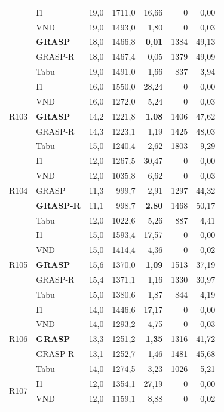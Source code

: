 {\begin{longtable}{llrrrrr}
  & I1 & 19,0 & 1711,0 & 16,66 & 0 & 0,00 \\
  & VND & 19,0 & 1493,0 & 1,80 & 0 & 0,03 \\
  & \textbf{GRASP} & 18,0 & 1466,8 & \textbf{0,01} & 1384 & 49,13 \\
  & GRASP-R & 18,0 & 1467,4 & 0,05 & 1379 & 49,09 \\
  & Tabu & 19,0 & 1491,0 & 1,66 & 837 & 3,94 \\
\midrule
\multirow{5}{*}{R103}
  & I1 & 16,0 & 1550,0 & 28,24 & 0 & 0,00 \\
  & VND & 16,0 & 1272,0 & 5,24 & 0 & 0,03 \\
  & \textbf{GRASP} & 14,2 & 1221,8 & \textbf{1,08} & 1406 & 47,62 \\
  & GRASP-R & 14,3 & 1223,1 & 1,19 & 1425 & 48,03 \\
  & Tabu & 15,0 & 1240,4 & 2,62 & 1803 & 9,29 \\
\midrule
\multirow{5}{*}{R104}
  & I1 & 12,0 & 1267,5 & 30,47 & 0 & 0,00 \\
  & VND & 12,0 & 1035,8 & 6,62 & 0 & 0,03 \\
  & GRASP & 11,3 & 999,7 & 2,91 & 1297 & 44,32 \\
  & \textbf{GRASP-R} & 11,1 & 998,7 & \textbf{2,80} & 1468 & 50,17 \\
  & Tabu & 12,0 & 1022,6 & 5,26 & 887 & 4,41 \\
\midrule
\multirow{5}{*}{R105}
  & I1 & 15,0 & 1593,4 & 17,57 & 0 & 0,00 \\
  & VND & 15,0 & 1414,4 & 4,36 & 0 & 0,02 \\
  & \textbf{GRASP} & 15,6 & 1370,0 & \textbf{1,09} & 1513 & 37,19 \\
  & GRASP-R & 15,4 & 1371,1 & 1,16 & 1330 & 30,97 \\
  & Tabu & 15,0 & 1380,6 & 1,87 & 844 & 4,19 \\
\midrule
\multirow{5}{*}{R106}
  & I1 & 14,0 & 1446,6 & 17,17 & 0 & 0,00 \\
  & VND & 14,0 & 1293,2 & 4,75 & 0 & 0,03 \\
  & \textbf{GRASP} & 13,3 & 1251,2 & \textbf{1,35} & 1316 & 41,72 \\
  & GRASP-R & 13,1 & 1252,7 & 1,46 & 1481 & 45,68 \\
  & Tabu & 14,0 & 1274,5 & 3,23 & 1026 & 5,21 \\
\midrule
\multirow{5}{*}{R107}
  & I1 & 12,0 & 1354,1 & 27,19 & 0 & 0,00 \\
  & VND & 12,0 & 1159,1 & 8,88 & 0 & 0,02 \\

\end{longtable}}
